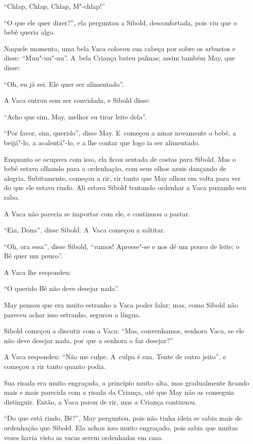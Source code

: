 ``Chlap, Chlap, Chlap, M"-chlap!''

``O que ele quer dizer?'', ela perguntou a Sibold, desconfortada, pois
viu que o bebê queria algo.

Naquele momento, uma bela Vaca colocou sua cabeça por sobre os arbustos
e disse: ``Muu"-uu"-uu''. A~bela Criança bateu palmas; assim também May,
que disse:

``Oh, eu já sei. Ele quer ser alimentado''.

A Vaca entrou sem ser convidada, e Sibold disse:

``Acho que sim, May, melhor eu tirar leite dela''.

``Por favor, sim, querido'', disse May. E~começou a ninar novamente o
bebê, a beijá"-lo, a acalentá"-lo, e a lhe contar que logo ia ser
alimentado.

Enquanto se ocupava com isso, ela ficou sentada de costas para Sibold.
Mas o bebê estava olhando para a ordenhação, com seus olhos azuis
dançando de alegria. Subitamente, começou a rir, rir tanto que May olhou
em volta para ver do que ele estava rindo. Ali estava Sibold tentando
ordenhar a Vaca puxando seu rabo.

A Vaca não parecia se importar com ele, e continuou a pastar.

``Eia, Dona'', disse Sibold. A~Vaca começou a saltitar.

``Oh, ora essa'', disse Sibold, ``vamos! Apresse"-se e nos dê um pouco de
leite; o Bê quer um pouco''.

A Vaca lhe respondeu:

``O querido Bê não deve desejar nada''.

May pensou que era muito estranho a Vaca poder falar; mas, como Sibold
não pareceu achar isso estranho, segurou a língua.

Sibold começou a discutir com a Vaca: ``Mas, convenhamos, senhora Vaca,
se ele não deve desejar nada, por que a senhora o faz desejar?''

A Vaca respondeu: ``Não me culpe. A~culpa é sua. Tente de outro jeito'',
e começou a rir tanto quanto podia.

Sua risada era muito engraçada, a princípio muito alta, mas gradualmente
ficando mais e mais parecida com a risada da Criança, até que May não as
conseguia distinguir. Então, a Vaca parou de rir, mas a Criança
continuou.

``Do que está rindo, Bê?'', May perguntou, pois não tinha ideia se sabia
mais de ordenhação que Sibold. Ela achou isso muito engraçado, pois
sabia que muitas vezes havia visto as vacas serem ordenhadas em casa.

